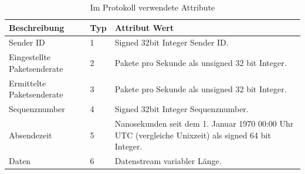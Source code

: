 \begin{table}[htdp]
\centering
\caption{Im Protokoll verwendete Attribute}
\label{tab:prot}
\begin{tabular}{|l|l|p{9.5cm}|}
\hline
\textbf{Beschreibung} & \textbf{Typ} & \textbf{Attribut Wert} \\
\hline
Sender ID & 1 & Signed 32bit Integer Sender ID.\\
\hline
Eingestellte Paketsenderate & 2 & Pakete pro Sekunde als unsigned 32 bit Integer. \\
\hline
Ermittelte Paketsenderate & 3 & Pakete pro Sekunde als unsigned 32 bit Integer. \\
\hline
Sequenznumber & 4 & Signed 32bit Integer Sequenznumber. \\
\hline
Absendezeit & 5 & Nanosekunden seit dem 1. Januar 1970 00:00 Uhr UTC (vergleiche Unixzeit) als signed 64 bit Integer. \\
\hline
Daten & 6 & Datenstream variabler Länge. \\
\hline
\end{tabular}
\end{table}



